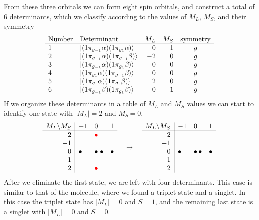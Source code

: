 \documentclass[../Main/chem532-notes.tex]{subfiles}
\begin{document}
\begin{example}
From these three orbitals we can form eight spin orbitals, and construct a total of 6 determinants, which we classify according to the values of $M_L$, $M_S$, and their symmetry
\begin{equation}
   \begin{array}{llrrc}
    \text{Number} & \text{Determinant} & M_L & M_S & \text{symmetry} \\
    \hline
   1 & \ket{(1\pi_{g_{-1}} \alpha) (1\pi_{g_{1}} \alpha)} & 0 & 1 & g\\
   2 & \ket{(1\pi_{g_{-1}} \alpha) (1\pi_{g_{-1}} \beta)} & -2 & 0 & g \\ 
   3 & \ket{(1\pi_{g_{-1}} \alpha) (1\pi_{g_{1}} \beta)} & 0 & 0 & g \\    
   4 & \ket{(1\pi_{g_{1}} \alpha) (1\pi_{g_{-1}} \beta)} & 0 & 0 & g \\       
   5 & \ket{(1\pi_{g_{1}} \alpha) (1\pi_{g_{1}} \beta)} & 2 & 0 & g \\
   6 & \ket{(1\pi_{g_{-1}} \beta) (1\pi_{g_{1}} \beta)} & 0 & -1 & g
       \end{array}
\end{equation}
If we organize these determinants in a table of $M_L$ and $M_S$ values we can start to identify one state with $|M_L| = 2$ and $M_S = 0$.
\begin{equation*}
   \begin{array}{r|lll}
    M_L \backslash M_S & -1 & 0 & 1 \\
    \hline
-2 & & \color{red}{\bullet} &  \\
-1 &   & &  \\
0 & \bullet &\bullet \; \bullet& \bullet\\
1 &  & & \\
2 & &{\color{red}\bullet}&
\end{array}
\quad \rightarrow \quad 
   \begin{array}{r|lll}
    M_L \backslash M_S & -1 & 0 & 1 \\
    \hline
-2 & &  &  \\
-1 &   & &  \\
0 & \bullet &\bullet \, \bullet& \bullet\\
1 &  & & \\
2 & &&
\end{array}
\end{equation*}
After we eliminate the first state, we are left with four determinants. This case is similar to that of the  molecule, where we found a triplet state and a singlet.
In this case the triplet state has $|M_L| = 0$ and $S=1$, and the remaining last state is a singlet with $|M_L| = 0$ and $S=0$.


\end{example}
\end{document}
